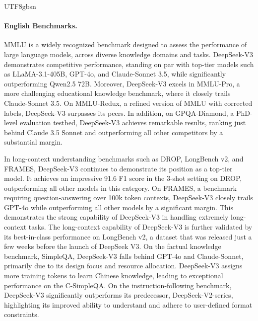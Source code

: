 \documentclass[11pt, a4paper, logo, copyright, nonumbering]{deepseek}
\newcommand{\dsvii}{DeepSeek-V2}
\newcommand{\dsviii}{DeepSeek-V3}
\begin{document}
\begin{CJK*}{UTF8}{gbsn}
\paragraph{English Benchmarks.}
MMLU is a widely recognized benchmark designed to assess the performance of large language models, across diverse knowledge domains and tasks. 
\dsviii{} demonstrates competitive performance, standing on par with top-tier models such as LLaMA-3.1-405B, GPT-4o, and Claude-Sonnet 3.5, while significantly outperforming Qwen2.5 72B. 
Moreover, \dsviii{} excels in MMLU-Pro, a more challenging educational knowledge benchmark, where it closely trails Claude-Sonnet 3.5. 
On MMLU-Redux, a refined version of MMLU with corrected labels, \dsviii{} surpasses its peers. 
In addition, on GPQA-Diamond, a PhD-level evaluation testbed, \dsviii{} achieves remarkable results, ranking just behind Claude 3.5 Sonnet and outperforming all other competitors by a substantial margin.

In long-context understanding benchmarks such as DROP, LongBench v2, and FRAMES, \dsviii{} continues to demonstrate its position as a top-tier model. 
It achieves an impressive 91.6 F1 score in the 3-shot setting on DROP, outperforming all other models in this category. 
On FRAMES, a benchmark requiring question-answering over 100k token contexts, \dsviii{} closely trails GPT-4o while outperforming all other models by a significant margin. 
This demonstrates the strong capability of \dsviii{} in handling extremely long-context tasks. 
The long-context capability of \dsviii{} is further validated by its best-in-class performance on LongBench v2, a dataset that was released just a few weeks before the launch of DeepSeek V3. 
On the factual knowledge benchmark, SimpleQA, \dsviii{} falls behind GPT-4o and Claude-Sonnet, primarily due to its design focus and resource allocation. 
\dsviii{} assigns more training tokens to learn Chinese knowledge, leading to exceptional performance on the C-SimpleQA. 
On the instruction-following benchmark, \dsviii{} significantly outperforms its predecessor, \dsvii{}-series, highlighting its improved ability to understand and adhere to user-defined format constraints.


\end{CJK*}
\end{document}
